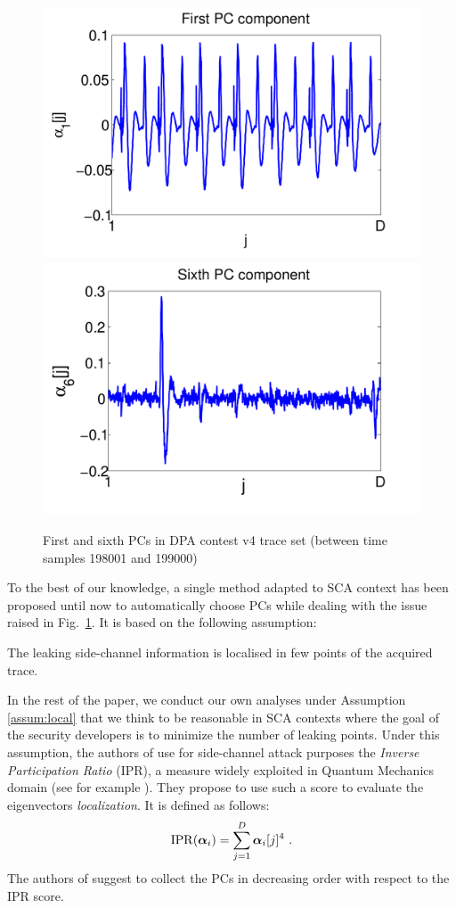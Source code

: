 \begin{figure}
\includegraphics[width=.45\textwidth]{../Figures/CARDIS2015/DPAcontestPC1_new.pdf} 
\includegraphics[width=.45\textwidth]{../Figures/CARDIS2015/DPAcontestPC6_new.pdf} 
\caption{First and sixth PCs in DPA contest v4 trace set (between time samples 198001 and 199000)}\label{fig:DPAcontest}
\end{figure}
To the best of our knowledge, a single method adapted to SCA context has been proposed until now to automatically choose PCs \cite{SCAclassProbl} while dealing with the issue raised in Fig.~\ref{fig:DPAcontest}. It is based on the following assumption:
\begin{assumption}\label{assum:local}
The leaking side-channel information is localised in few points of the acquired trace.
\end{assumption}
In the rest of the paper, we conduct our own analyses under Assumption \ref{assum:local} that we think to be reasonable in SCA contexts where the goal of the security developers is to minimize the number of leaking points.
Under this assumption, the authors of \cite{SCAclassProbl} use for side-channel attack purposes the {\em Inverse Participation Ratio} (IPR), a measure widely exploited in Quantum Mechanics domain (see for example \cite{guhr1998random}). They propose to use such a score to evaluate the eigenvectors {\em localization}. It is defined as follows:
\begin{equation}
\mathrm{IPR}(\boldsymbol{\alpha}_i) = \sum_{j=1}^D \boldsymbol{\alpha}_i[j]^4 \mbox{ .}
\end{equation}
The authors of \cite{SCAclassProbl} suggest to collect the PCs in decreasing order with respect to the IPR score.\\

